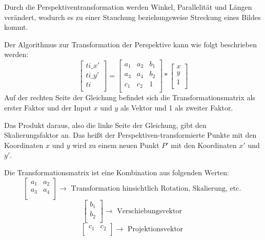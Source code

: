 Durch die Perspektiventransformation werden Winkel, Parallelität und Längen verändert, wodurch es zu einer Stauchung beziehungsweise Streckung eines Bildes kommt.

Der Algorithmus zur Transformation der Perspektive kann wie folgt beschrieben werden:
\[
  \left[\begin{array}{r}
      ti\_x' \\
      ti\_y' \\
      ti     \\
    \end{array}\right]
  = \left[\begin{array}{rrr}
      a_{ 1 } & a_{ 2 } & b_{ 1 } \\
      a_{ 3 } & a_{ 4 } & b_{ 2 } \\
      c_{ 1 } & c_{ 2 } & 1       \\
    \end{array}\right]
  * \left[\begin{array}{r}
      x \\
      y \\
      1 \\
    \end{array}\right]
\]
Auf der rechten Seite der Gleichung befindet sich die Transformationsmatrix als erster Faktor und der Input \(x\) und \(y\) als Vektor und 1 als zweiter Faktor.

Das Produkt daraus, also die linke Seite der Gleichung, gibt den Skalierungsfaktor an. Das heißt der Perspektiven-transformierte Punkte mit den Koordinaten \(x\) und \(y\) wird zu einem neuen Punkt \(P'\) mit den Koordinaten \(x'\) und \(y'\).

Die Transformationsmatrix ist eine Kombination aus folgenden Werten:
\[
  \left[\begin{array}{rr}
      a_{ 1 } & a_{ 2 } \\
      a_{ 3 } & a_{ 4 } \\
    \end{array}
    \right]
  \to
  \text{ Transformation hinsichtlich Rotation, Skalierung, etc. }
\]
\[
  \left[\begin{array}{r}
      b_{ 1 } \\
      b_{ 2 } \\
    \end{array}
    \right]
  \to
  \text{ Verschiebungsvektor }
\]
\[
  \left[\begin{array}{rr}
      c_{ 1 } & c_{ 2 } \\
    \end{array}
    \right]
  \to
  \text{ Projektionsvektor }
\]


